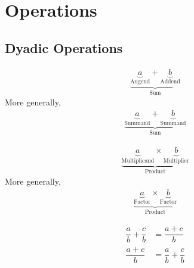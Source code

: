 \documentclass[20150903-160354-rs2.2-MarksMathNotebook.tex]{subfiles}
\begin{document}
%
%

\chapter{Operations}



\section{Dyadic Operations}


\begin{definition}
\begin{align}
\underbrace{\underbrace{a}_{\text{Augend}}+\underbrace{b}_{\text{Addend}}}_{\text{Sum}} \label{eq:ooa}
\end{align}
More generally,
\begin{align}
\underbrace{\underbrace{a}_{\text{Summand}}+\underbrace{b}_{\text{Summand}}}_{\text{Sum}} \label{eq:ooag}
\end{align}
\end{definition}

\begin{definition} 
\begin{align}
\underbrace{\underbrace{a}_{\text{Multiplicand}} \times \underbrace{b}_{\text{Multiplier}}}_{\text{Product}} \label{eq:oom}
\end{align}
More generally,
\begin{align}
\underbrace{\underbrace{a}_{\text{Factor}} \times \underbrace{b}_{\text{Factor}}}_{\text{Product}} \label{eq:oomg}
\end{align}

\end{definition}


\begin{definition}
\begin{subequations}
\begin{align}
\dfrac{a}{b} + \dfrac{c}{b} &= \dfrac{a+c}{b} \label{eq:cd1} \\
\dfrac{a+c}{b}&= \dfrac{a}{b} + \dfrac{c}{b} \label{eq:cd2}
\end{align}
\end{subequations}
\end{definition}
\end{document}
